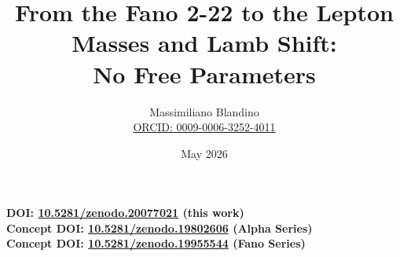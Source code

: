 \documentclass[12pt]{article}
\title{From the Fano 2-22 to the Lepton Masses and Lamb Shift: \\ No Free Parameters}
\author{Massimiliano Blandino \\ 
\href{https://orcid.org/0009-0006-3252-4011}{ORCID: 0009-0006-3252-4011}}
\date{May 2026}
\begin{document}
\maketitle

\begin{center}
\large\textbf{DOI: \href{https://doi.org/10.5281/zenodo.20077021}{10.5281/zenodo.20077021} (this work)} \\
\large\textbf{Concept DOI: \href{https://doi.org/10.5281/zenodo.19802606}{10.5281/zenodo.19802606} (Alpha Series)} \\
\large\textbf{Concept DOI: \href{https://doi.org/10.5281/zenodo.19955544}{10.5281/zenodo.19955544} (Fano Series)}
\end{center}

\vspace{0.5cm}
\end{document}
